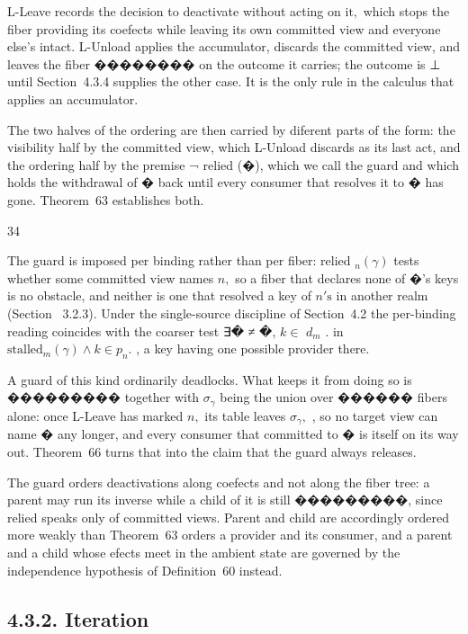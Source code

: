 \documentclass[
  10
]{article}
\newcounter{none} %
\begin{document}
L-Leave records the decision to deactivate without acting on
\({ \mathrm { i t } } ,\) which stops the fiber providing its coefects
while leaving its own committed view and everyone else's intact.
L-Unload applies the accumulator, discards the committed view, and
leaves the fiber �������� on the outcome it carries; the outcome is ⊥
until Section~4.3.4 supplies the other case. It is the only rule in the
calculus that applies an accumulator.

The two halves of the ordering are then carried by diferent parts of the
form: the visibility half by the committed view, which L-Unload discards
as its last act, and the ordering half by the premise ¬ relied (�),
which we call the guard and which holds the withdrawal of � back until
every consumer that resolves it to � has gone. Theorem~63 establishes
both.

34

The guard is imposed per binding rather than per fiber: relied
\(_ n ( \gamma )\) tests whether some committed view names \(n ,\) so a
fiber that declares none of �'s keys is no obstacle, and neither is one
that resolved a key of \(n \mathrm { { ' s } }\) in another realm
(Section~ 3.2.3). Under the single-source discipline of Section~4.2 the
per-binding reading coincides with the coarser test ∃� ≠ �, \(k \in\)
\(d _ { m }\) . in
\({ \mathrm { s t a l l e d } } _ { m } ( \gamma ) \wedge k \in p _ { n } .\)
, a key having one possible provider there.

A guard of this kind ordinarily deadlocks. What keeps it from doing so
is ��������� together with \(\sigma _ { \gamma }\) being the union over
������ fibers alone: once L-Leave has marked \(n ,\) its table leaves
\(\sigma _ { \gamma } ,\) , so no target view can name � any longer, and
every consumer that committed to � is itself on its way out. Theorem~66
turns that into the claim that the guard always releases.

The guard orders deactivations along coefects and not along the fiber
tree: a parent may run its inverse while a child of it is still
���������, since relied speaks only of committed views. Parent and child
are accordingly ordered more weakly than Theorem~63 orders a provider
and its consumer, and a parent and a child whose efects meet in the
ambient state are governed by the independence hypothesis of
Definition~60 instead.

\subsection{4.3.2. Iteration}\label{iteration}
\end{document}
